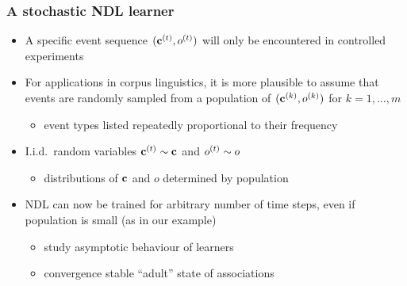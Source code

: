 \documentclass[t]{beamer} %
\begin{document}
\begin{frame}[c]
\end{frame}

\begin{frame}
  \frametitle{A stochastic NDL learner}

  \begin{itemize}
  \item<1-> A specific event sequence $(\vc[t], o\psupt)$ will only be encountered in controlled experiments
  \item<2-> For applications in corpus linguistics, it is more plausible to assume that events are randomly sampled from a population of  $(\vc[k], o\psup{k})$ for $k = 1, \ldots, m$
    \begin{itemize}
    \item[\hand] event types listed repeatedly proportional to their frequency
    \end{itemize}
  \item<3-> I.i.d.\ random variables $\vc[t] \sim \vc$ and $o^{(t)}\sim o$
    \begin{itemize}
    \item[\hand] distributions of $\vc$ and $o$ determined by population
    \end{itemize}
  \item<3-> NDL can now be trained for arbitrary number of time steps, even if population is small (as in our example)
    \begin{itemize}
    \item study asymptotic behaviour of learners
    \item convergence \so stable ``adult'' state of associations
    \end{itemize}
  \end{itemize}
\end{frame}
\end{document}
